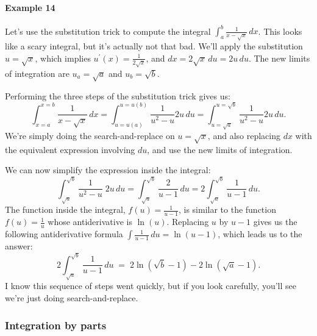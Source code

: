 			\paragraph{Example 14}

				Let's use the substitution trick to compute the integral $\int_a^b \frac{1}{x - \sqrt{x}} \, dx$.
				This looks like a scary integral,
				but it's actually not that bad.
				We'll apply the substitution $u=\sqrt{x}$,
				which implies $u^{\prime\!}(x) =  \frac{1}{2\sqrt{x}}$,
				and $dx = 2\sqrt{x}\,du = 2u\,du$.
				The new limits of integration are $u_a = \sqrt{a}$ and $u_b = \sqrt{b}$.

				Performing the three steps of the substitution trick gives us:
				\[
					\int_{x=a}^{x=b} \!\! \frac{1}{x - \sqrt{x}} \, dx 
						=  \int_{u=u(a)}^{u=u(b)} \!\!\frac{1}{u^2 - u}  2u\,du
						=  \int_{u=\sqrt{a}}^{u=\sqrt{b}} \!\frac{1}{u^2 - u}  2u\,du.
				\]
				We're simply doing the search-and-replace on $u = \sqrt{x}$,
				and also replacing $dx$
				with the equivalent expression involving $du$,
				and use the new limits of integration.

				We can now simplify the expression inside the integral:
				\[
					\int_{\sqrt{a}}^{\sqrt{b}} \frac{1}{u^2 - u} \; 2u\,du
					= \int_{\sqrt{a}}^{\sqrt{b}}  \frac{2}{u - 1} \, du
					= 2 \int_{\sqrt{a}}^{\sqrt{b}}  \frac{1}{u - 1} \, du.
				\]
				The function inside the integral,
				$f(u) = \frac{1}{u-1}$,
				is similar to the function $f(u) = \frac{1}{u}$
				whose antiderivative is $\ln(u)$.
				Replacing $u$ by $u-1$
				gives us the following antiderivative formula $\int \frac{1}{u - 1} \, du = \ln(u-1)$,
				which leads us to the answer:
				\[
					2 \int_{\sqrt{a}}^{\sqrt{b}}  \frac{1}{u - 1} \, du
					\; = \; 2\ln(\sqrt{b}-1) - 2\ln(\sqrt{a}-1).
				\]
				I know this sequence of steps went quickly,
				but if you look carefully,
				you'll see we're just doing search-and-replace.




		\subsubsection{Integration by parts}

